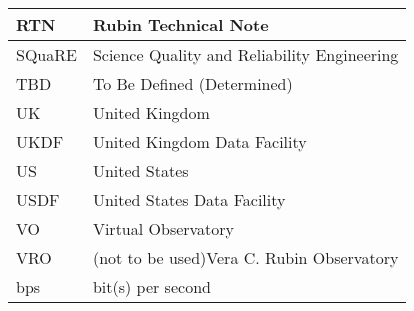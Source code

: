 \begin{longtable}{p{}p{}}
RTN & Rubin Technical Note \\\hline
SQuaRE & Science Quality and Reliability Engineering \\\hline
TBD & To Be Defined (Determined) \\\hline
UK & United Kingdom \\\hline
UKDF & United Kingdom Data Facility \\\hline
US & United States \\\hline
USDF & United States Data Facility \\\hline
VO & Virtual Observatory \\\hline
VRO & (not to be used)Vera C. Rubin Observatory \\\hline
bps & bit(s) per second \\\hline
\end{longtable}
